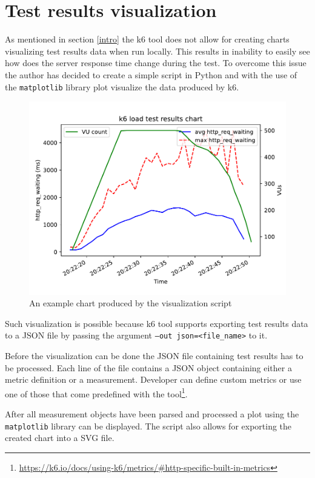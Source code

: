 \documentclass[12pt, a4paper]{article}
\let\oldsection\section
\renewcommand\section{\clearpage\oldsection}
\begin{document}
\section{Test results visualization}

As mentioned in section \ref{intro} the k6 tool does not allow for creating charts visualizing test results data when run locally.
This results in inability to easily see how does the server response time change during the test.
To overcome this issue the author has decided to create a simple script in Python and with the use of the \texttt{matplotlib} library plot visualize the data produced by k6.

\begin{figure}[!ht]
    \centering 
    \includegraphics[width=1\textwidth]{pdf/visualizer-example.pdf}
    \caption{An example chart produced by the visualization script}
\end{figure}

Such visualization is possible because k6 tool supports exporting test results data to a JSON file by passing the argument \texttt{--out json=<file\_name>} to it.

Before the visualization can be done the JSON file containing test results has to be processed.
Each line of the file contains a JSON object containing either a metric definition or a measurement.
Developer can define custom metrics or use one of those that come predefined with the tool\footnote{\url{https://k6.io/docs/using-k6/metrics/#http-specific-built-in-metrics}}.

After all measurement objects have been parsed and processed a plot using the \texttt{matplotlib} library can be displayed.
The script also allows for exporting the created chart into a SVG file.
\end{document}
